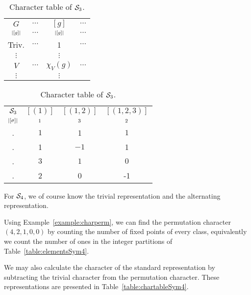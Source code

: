\begin{table}[hbt!]
	\centering
	\parbox[t]{.45\linewidth}{
		\centering
		\begin{tabular}{c | c c c }
			$G$    & $\cdots $ & $[g]$        & $\cdots$ \\ 
			$\scriptstyle|[g]|$ & $\cdots$ & $\scriptstyle|[g]|$ & $\cdots$ \\ \hline
			Triv.   & $\cdots$  & 1            & $\cdots$ \\
			$\vdots$ &           & $\vdots$     &          \\
			$V$    & $\cdots$  & $\chi_V(g) $ & $\cdots$ \\
			$\vdots$ &           & $\vdots$     &
		\end{tabular}
		\caption{Layout of a character table of a group $G$.}
		\label{table:chartableexample}
	}
	\hfill
	\parbox[t]{.45\linewidth}{
		\centering
		\begin{tabular}{c | c c c }
			$\mathcal{S}_3$  & $[(1)]$ & $[(1,2)]$ & $[(1,2,3)]$ \\ 
			$\scriptstyle|[\sigma]|$ & $\scriptstyle1$ & $\scriptstyle3$ & $\scriptstyle2$ \\ \hline
			\Triv. & $1$     & 1         & $1$       \\
			\Alt.  & 1       & $-1$      & 1         \\
			\Perm. & $3$     & $1$       & $0$       \\
			\Stan. & 2       & 0         & -1        
		\end{tabular}
		\caption{Character table of $\mathcal{S}_3$.}
		\label{table:chartableSym3}
	}
\end{table}




\begin{example}
	For $\mathcal{S}_4$, we of course know the trivial representation and the alternating representation. 
	
	Using Example~\ref{example:charperm}, we can find the permutation character $(4,2,1,0,0)$ by counting the number of fixed points of every class, equivalently we count the number of ones in the integer partitions of Table~\ref{table:elementsSym4}. 
	
	We may also calculate the character of the standard representation by subtracting the trivial character from the permutation character. These representations are presented in Table~\ref{table:chartableSym4}.
\end{example}

